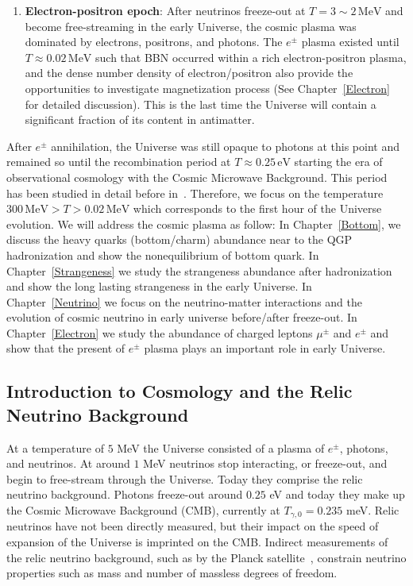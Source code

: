 \begin{enumerate}
 \item \textbf{Electron-positron epoch}: After neutrinos freeze-out at $T=3\sim2\,\mathrm{MeV}$ and become free-streaming in the early Universe, the cosmic plasma was dominated by electrons, positrons, and photons. The $e^\pm$ plasma existed until $T\approx0.02\,\mathrm{MeV}$ such that BBN occurred within a rich electron-positron plasma, and the dense number density of electron/positron also provide the opportunities to investigate magnetization process (See Chapter~\ref{Electron} for detailed discussion). This is the last time the Universe will contain a significant fraction of its content in antimatter.
\end{enumerate}
After $e^\pm$ annihilation, the Universe was still opaque to photons at this point and remained so until the recombination period at $T\approx0.25\,\mathrm{eV}$ starting the era of observational cosmology with the Cosmic Microwave Background. This period has been studied in detail before in~\cite{Planck:2018vyg}. Therefore, we focus on the temperature $300\,\mathrm{MeV}>T>0.02\,\mathrm{MeV}$ which corresponds to the first hour of the Universe evolution. We will address the cosmic plasma as follow: In Chapter~\ref{Bottom}, we discuss the heavy quarks (bottom/charm) abundance near to the QGP hadronization and show the nonequilibrium of bottom quark. In Chapter~\ref{Strangeness} we study the strangeness abundance after hadronization and show the long lasting strangeness in the early Universe. In Chapter~\ref{Neutrino} we focus on the neutrino-matter interactions and the evolution of cosmic neutrino in early universe before/after freeze-out. In Chapter~\ref{Electron} we study the abundance of charged leptons $\mu^\pm$ and $e^\pm$ and show that the present of $e^\pm$ plasma plays an important role in early Universe.

\subsection{Introduction to Cosmology and the Relic Neutrino Background}\label{ch:intro}
At a temperature of $5$ MeV the Universe consisted of a plasma of $e^\pm$, photons, and neutrinos. At around $1$ MeV neutrinos stop interacting, or freeze-out, and begin to free-stream through the Universe. Today they comprise the relic neutrino background. Photons freeze-out around $0.25$ eV and today they make up the Cosmic Microwave Background (CMB), currently at $T_{\gamma,0}=0.235$ meV. Relic neutrinos have not been directly measured, but their impact on the speed of expansion of the Universe is imprinted on the CMB. Indirect measurements of the relic neutrino background, such as by the Planck satellite~\cite{Planck}, constrain neutrino properties such as mass and number of massless degrees of freedom.

